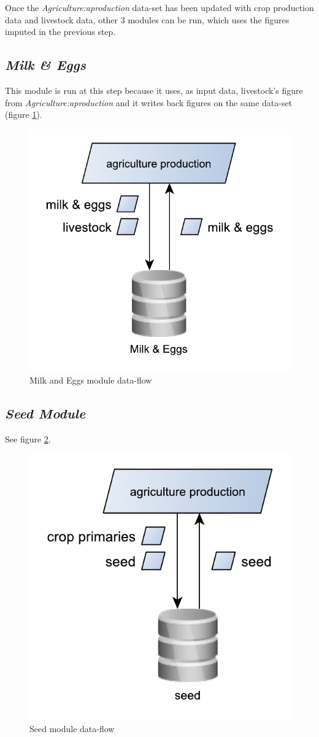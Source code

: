 \documentclass[]{article}
\begin{document}
Once the \emph{Agriculture:aproduction} data-set has been updated with
crop production data and livestock data, other 3 modules can be run,
which uses the figures imputed in the previous step.

\subsection{\texorpdfstring{\emph{Milk \&
Eggs}}{Milk \& Eggs}}\label{milk-eggs}

This module is run at this step because it uses, as input data,
livestock's figure from \emph{Agriculture:aproduction} and it writes
back figures on the same data-set (figure \ref{fig:f9}).

\begin{figure}[H]

{\centering \includegraphics[width=0.36\linewidth]{images/SwsFbs/09_milkEggs} 

}

\caption{\label{fig:f9}Milk and Eggs module data-flow}\label{fig:f9}
\end{figure}

\subsection{\texorpdfstring{\emph{Seed
Module}}{Seed Module}}\label{seed-module}

See figure \ref{fig:f10}.

\begin{figure}[H]

{\centering \includegraphics[width=0.35\linewidth]{images/SwsFbs/10_seed} 

}

\caption{\label{fig:f10}Seed module data-flow}\label{fig:f10}
\end{figure}
\end{document}
